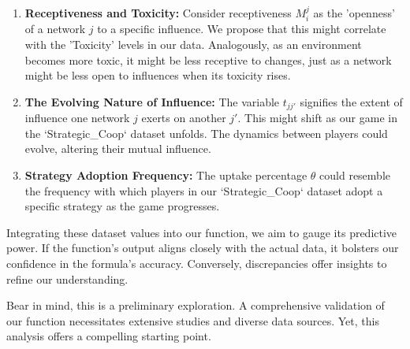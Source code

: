 \documentclass[sn-nature]{sn-jnl}%
\theoremstyle{thmstyleone}%
\theoremstyle{thmstyletwo}%
\theoremstyle{thmstylethree}%
\begin{document}
\begin{enumerate}
    \item \textbf{Receptiveness and Toxicity:} Consider receptiveness \( M_i^j \) as the 'openness' of a network \( j \) to a specific influence. We propose that this might correlate with the 'Toxicity' levels in our data. Analogously, as an environment becomes more toxic, it might be less receptive to changes, just as a network might be less open to influences when its toxicity rises.

    \item \textbf{The Evolving Nature of Influence:} The variable \( t_{jj'} \) signifies the extent of influence one network \( j \) exerts on another \( j' \). This might shift as our game in the `Strategic\_Coop` dataset unfolds. The dynamics between players could evolve, altering their mutual influence.

    \item \textbf{Strategy Adoption Frequency:} The uptake percentage \( \theta \) could resemble the frequency with which players in our `Strategic\_Coop` dataset adopt a specific strategy as the game progresses.
\end{enumerate}

Integrating these dataset values into our function, we aim to gauge its predictive power. If the function's output aligns closely with the actual data, it bolsters our confidence in the formula's accuracy. Conversely, discrepancies offer insights to refine our understanding.

Bear in mind, this is a preliminary exploration. A comprehensive validation of our function necessitates extensive studies and diverse data sources. Yet, this analysis offers a compelling starting point.
\end{document}
